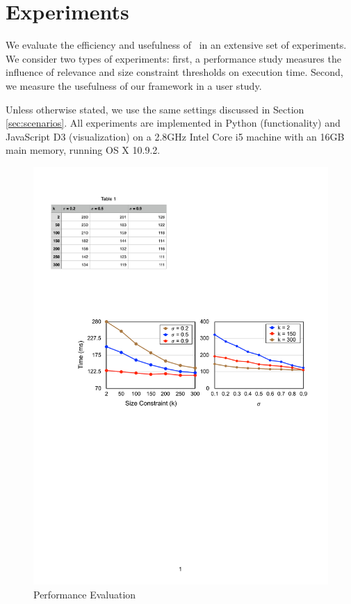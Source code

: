 \section{Experiments}
\label{sec:exp}
We evaluate the efficiency and usefulness of \framework\ in an extensive set of experiments. We consider two types of experiments: first, a performance study measures the influence of relevance and size constraint thresholds on execution time. Second, we measure the usefulness of our framework in a user study.

\vspace{5pt}
 Unless otherwise stated, we use the same settings discussed in Section \ref{sec:scenarios}. All experiments are implemented in Python (functionality) and JavaScript D3 (visualization) on a 2.8GHz Intel Core i5 machine with an 16GB main memory, running OS X 10.9.2.

\begin{figure}
 \centering
 \includegraphics[width=\columnwidth]{figs/performance}
\caption{Performance Evaluation}
\vspace{-10pt}
\label{fig:performance}
\end{figure}

